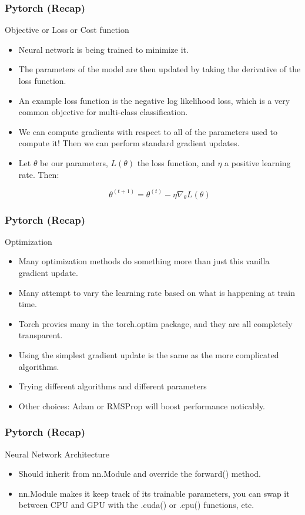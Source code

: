 \begin{frame}[fragile]
\frametitle{Pytorch (Recap)}
Objective or Loss or Cost function
\begin{itemize}
\item Neural network is being trained to minimize it.
\item The parameters of the model are then updated by taking the derivative of the loss function. 
\item An example loss function is the negative log likelihood loss, which is a very common objective for multi-class classification.
\item We can compute gradients with respect to all of the parameters used to compute it! Then we can perform standard gradient updates.
\item Let $\theta$ be our parameters,  $L(\theta)$ the loss function, and $\eta$ a positive learning rate. Then:

$$ \theta^{(t+1)} = \theta^{(t)} - \eta \nabla_\theta L(\theta) $$
\end{itemize}

\end{frame} 

\begin{frame}[fragile]
\frametitle{Pytorch (Recap)}
Optimization
\begin{itemize}
\item Many optimization methods do something more than just this vanilla gradient update.
\item Many attempt to vary the learning rate based on what is happening at train time. 
\item Torch provies many in the torch.optim package, and they are all completely transparent. 
\item Using the simplest gradient update is the same as the more complicated algorithms. 
\item Trying different algorithms and different parameters 
\item Other choices: Adam or RMSProp will boost performance noticably.
\end{itemize}

\end{frame} 

\begin{frame}[fragile]
\frametitle{Pytorch (Recap)}
Neural Network Architecture
\begin{itemize}
\item Should inherit from nn.Module and override the forward() method.
\item  nn.Module makes it keep track of its trainable parameters, you can swap it between CPU and GPU with the .cuda() or .cpu() functions, etc.
\end{itemize}

\end{frame} 
